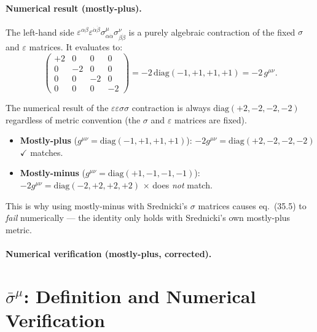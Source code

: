 \paragraph{Numerical result (mostly-plus).}

The left-hand side $\varepsilon^{\alpha\beta}\varepsilon^{\dot\alpha\dot\beta}
\sigma^\mu_{\alpha\dot\alpha}\sigma^\nu_{\beta\dot\beta}$ is a purely
algebraic contraction of the fixed $\sigma$ and $\varepsilon$ matrices.
It evaluates to:
\[
  \begin{pmatrix}
    +2 & 0 & 0 & 0 \\
    0 & -2 & 0 & 0 \\
    0 & 0 & -2 & 0 \\
    0 & 0 & 0 & -2
  \end{pmatrix}
  = -2\,\mathrm{diag}(-1,+1,+1,+1) = -2\,g^{\mu\nu}.
\]

\begin{metricnote}
The numerical result of the $\varepsilon\varepsilon\sigma\sigma$ contraction
is always $\mathrm{diag}(+2,-2,-2,-2)$ regardless of metric convention
(the $\sigma$ and $\varepsilon$ matrices are fixed).
\begin{itemize}
  \item \textbf{Mostly-plus} ($g^{\mu\nu}=\mathrm{diag}(-1,+1,+1,+1)$):\;
        $-2g^{\mu\nu} = \mathrm{diag}(+2,-2,-2,-2)$ $\checkmark$ matches.
  \item \textbf{Mostly-minus} ($g^{\mu\nu}=\mathrm{diag}(+1,-1,-1,-1)$):\;
        $-2g^{\mu\nu} = \mathrm{diag}(-2,+2,+2,+2)$ $\times$ does \emph{not} match.
\end{itemize}
This is why using mostly-minus with Srednicki's $\sigma$ matrices causes
eq.~(35.5) to \emph{fail} numerically --- the identity only holds with
Srednicki's own mostly-plus metric.
\end{metricnote}

\paragraph{Numerical verification (mostly-plus, corrected).}

\section{\texorpdfstring{$\bar\sigma^\mu$}{sigmabar\^{}mu}:
         Definition and Numerical Verification \quad [eq.~35.19--35.20]}

